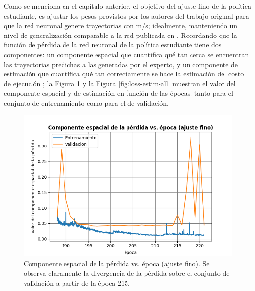\label{sec:results-finetune}

Como se menciona en el capítulo anterior, el objetivo del ajuste fino de la política estudiante, es ajustar los pesos provistos por los autores del trabajo original \cite{Loquercio2021} para que la red neuronal genere trayectorias con  m/s; idealmente, manteniendo un nivel de generalización comparable a la red publicada en \cite{Loquercio2021}. Recordando que la función de pérdida de la red neuronal de la política estudiante tiene dos componentes: un componente espacial que cuantifica qué tan cerca se encuentran las trayectorias predichas a las generadas por el experto, y un componente de estimación que cuantifica qué tan correctamente se hace la estimación del costo de ejecución  \cite{Loquercio2021}; la Figura \ref{fig:loss-space-all} y la Figura \ref{fig:loss-estim-all} muestran el valor del componente espacial y de estimación en función de las épocas, tanto para el conjunto de entrenamiento como para el de validación.

\begin{figure}[H]
    \centering
    \includegraphics[scale=0.6]{partes/img/loss-space-all.png}
    \caption[Componente espacial de la pérdida vs. época (ajuste fino).]{Componente espacial de la pérdida vs. época (ajuste fino). Se observa claramente la divergencia de la pérdida sobre el conjunto de validación a partir de la época 215.}
    \label{fig:loss-space-all}
\end{figure}

